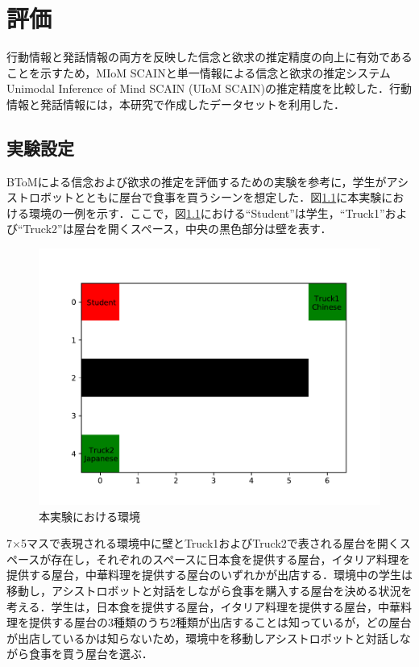\chapter{評価}
\par
行動情報と発話情報の両方を反映した信念と欲求の推定精度の向上に有効であることを示すため，MIoM SCAINと単一情報による信念と欲求の推定システムUnimodal Inference of Mind SCAIN (UIoM SCAIN)の推定精度を比較した．行動情報と発話情報には，本研究で作成したデータセットを利用した．


\section{実験設定}
\par
BToMによる信念および欲求の推定を評価するための実験を参考に，学生がアシストロボットとともに屋台で食事を買うシーンを想定した．図\ref{fig:ex_env1}に本実験における環境の一例を示す．ここで，図\ref{fig:ex_env1}における``Student''は学生，``Truck1''および``Truck2''は屋台を開くスペース，中央の黒色部分は壁を表す．
\begin{figure}[htbp]
  \begin{center}
    \includegraphics[scale=0.7]{./ex_env1.pdf}
    \caption{本実験における環境}
    \label{fig:ex_env1}
  \end{center}
\end{figure}
7$\times$5マスで表現される環境中に壁とTruck1およびTruck2で表される屋台を開くスペースが存在し，それぞれのスペースに日本食を提供する屋台，イタリア料理を提供する屋台，中華料理を提供する屋台のいずれかが出店する．環境中の学生は移動し，アシストロボットと対話をしながら食事を購入する屋台を決める状況を考える．学生は，日本食を提供する屋台，イタリア料理を提供する屋台，中華料理を提供する屋台の3種類のうち2種類が出店することは知っているが，どの屋台が出店しているかは知らないため，環境中を移動しアシストロボットと対話しながら食事を買う屋台を選ぶ．
